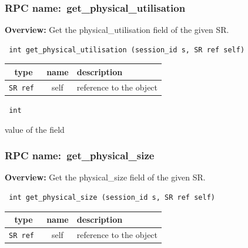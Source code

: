 \subsubsection{RPC name:~get\_physical\_utilisation}

{\bf Overview:} 
Get the physical\_utilisation field of the given SR.

\begin{verbatim} int get_physical_utilisation (session_id s, SR ref self)\end{verbatim}



 
\vspace{0.3cm}
\begin{tabular}{|c|c|p{7cm}|}
 \hline
{\bf type} & {\bf name} & {\bf description} \\ \hline
{\tt SR ref } & self & reference to the object \\ \hline 

\end{tabular}

\vspace{0.3cm}

{\tt 
int
}


value of the field
\vspace{0.3cm}
\vspace{0.3cm}
\vspace{0.3cm}
\subsubsection{RPC name:~get\_physical\_size}

{\bf Overview:} 
Get the physical\_size field of the given SR.

\begin{verbatim} int get_physical_size (session_id s, SR ref self)\end{verbatim}



 
\vspace{0.3cm}
\begin{tabular}{|c|c|p{7cm}|}
 \hline
{\bf type} & {\bf name} & {\bf description} \\ \hline
{\tt SR ref } & self & reference to the object \\ \hline 

\end{tabular}

